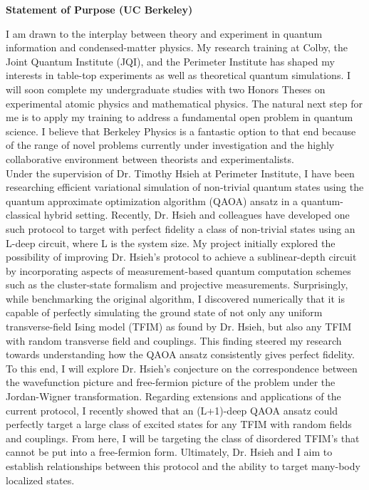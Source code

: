 \documentclass[12pt]{article}
\begin{document}
\begin{center}
	\textbf{Statement of Purpose (UC Berkeley)}
\end{center}
I am drawn to the interplay between theory and experiment in quantum information and condensed-matter physics. My research training at Colby, the Joint Quantum Institute (JQI), and the Perimeter Institute has shaped my interests in table-top experiments as well as theoretical quantum simulations. I will soon complete my undergraduate studies with two Honors Theses on experimental atomic physics and mathematical physics. The natural next step for me is to apply my training to address a fundamental open problem in quantum science. I believe that Berkeley Physics is a fantastic option to that end because of the range of novel problems currently under investigation and the highly collaborative environment between theorists and experimentalists.   \\ 

Under the supervision of Dr. Timothy Hsieh at Perimeter Institute, I have been researching efficient variational simulation of non-trivial quantum states using the quantum approximate optimization algorithm (QAOA) ansatz in a quantum-classical hybrid setting. Recently, Dr. Hsieh and colleagues have developed one such protocol to target with perfect fidelity a class of non-trivial states using an L-deep circuit, where L is the system size. My project initially explored the possibility of improving Dr. Hsieh's protocol to achieve a sublinear-depth circuit by incorporating aspects of measurement-based quantum computation schemes such as the cluster-state formalism and projective measurements. Surprisingly, while benchmarking the original algorithm, I discovered numerically that it is capable of perfectly simulating the ground state of not only any uniform transverse-field Ising model (TFIM) as found by Dr. Hsieh, but also any TFIM with random transverse field and couplings. This finding steered my research towards understanding how the QAOA ansatz consistently gives perfect fidelity. To this end, I will explore Dr. Hsieh's conjecture on the correspondence between the wavefunction picture and free-fermion picture of the problem under the Jordan-Wigner transformation. Regarding extensions and applications of the current protocol, I recently showed that an (L+1)-deep QAOA ansatz could perfectly target a large class of excited states for any TFIM with random fields and couplings. From here, I will be targeting the class of disordered TFIM's that cannot be put into a free-fermion form. Ultimately, Dr. Hsieh and I aim to establish relationships between this protocol and the ability to target many-body localized states.\\
\end{document}
